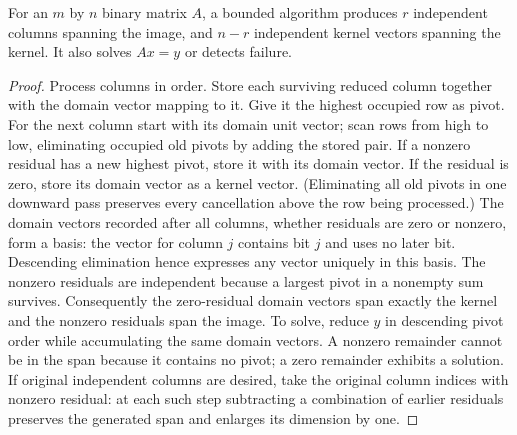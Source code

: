 \begin{lemma}\label{idx-algebraic103}
For an $m$ by $n$ binary matrix $A$, a bounded algorithm produces $r$
independent columns spanning the image, and $n-r$ independent kernel
vectors spanning the kernel. It also solves $Ax=y$ or detects failure.
\end{lemma}
\begin{proof}
Process columns in order. Store each surviving reduced column together
with the domain vector mapping to it. Give it the highest occupied row
as pivot. For the next column start with its domain unit vector; scan rows
from high to low, eliminating occupied old pivots by adding the stored
pair. If a nonzero residual has a new highest pivot, store it with its
domain vector. If the residual is zero, store its domain vector as a
kernel vector. (Eliminating all old pivots in one downward pass preserves
every cancellation above the row being processed.) The domain vectors
recorded after all columns, whether residuals are zero or nonzero, form a
basis: the vector for column $j$ contains bit $j$ and uses no later bit.
Descending elimination hence expresses any vector uniquely in this basis.
The nonzero residuals are independent because a largest pivot in a
nonempty sum survives. Consequently the zero-residual domain vectors span
exactly the kernel and the nonzero residuals span the image. To solve,
reduce $y$ in descending pivot order while accumulating the same domain
vectors. A nonzero remainder cannot be in the span because it contains no
pivot; a zero remainder exhibits a solution. If original independent
columns are desired, take the original column indices with nonzero
residual: at each such step subtracting a combination of earlier
residuals preserves the generated span and enlarges its dimension by one.
\end{proof}

